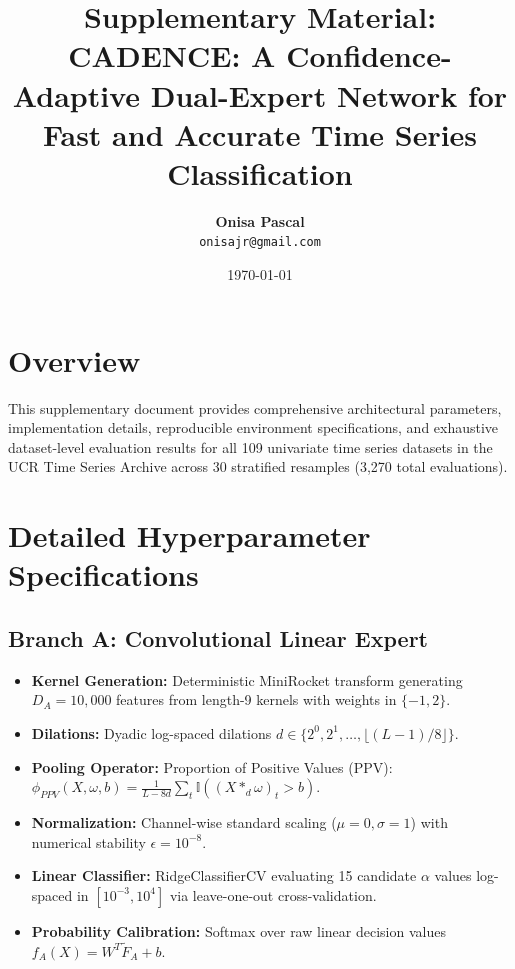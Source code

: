 \documentclass[journal,onecolumn]{article}
\title{\textbf{Supplementary Material:\\CADENCE: A Confidence-Adaptive Dual-Expert Network for Fast and Accurate Time Series Classification}}
\author{
    \textbf{Onisa Pascal}\\
    \texttt{onisajr@gmail.com}
}
\date{\today}
\begin{document}
\maketitle

\section{Overview}
This supplementary document provides comprehensive architectural parameters, implementation details, reproducible environment specifications, and exhaustive dataset-level evaluation results for all 109 univariate time series datasets in the UCR Time Series Archive across 30 stratified resamples (3,270 total evaluations).

\section{Detailed Hyperparameter Specifications}

\subsection{Branch A: Convolutional Linear Expert}
\begin{itemize}
    \item \textbf{Kernel Generation:} Deterministic MiniRocket transform generating $D_A = 10,000$ features from length-9 kernels with weights in $\{-1, 2\}$.
    \item \textbf{Dilations:} Dyadic log-spaced dilations $d \in \{2^0, 2^1, \dots, \lfloor (L-1)/8 \rfloor\}$.
    \item \textbf{Pooling Operator:} Proportion of Positive Values (PPV): $\phi_{PPV}(X, \omega, b) = \frac{1}{L - 8d} \sum_t \mathbb{I}((X *_{d} \omega)_t > b)$.
    \item \textbf{Normalization:} Channel-wise standard scaling ($\mu=0, \sigma=1$) with numerical stability $\epsilon = 10^{-8}$.
    \item \textbf{Linear Classifier:} RidgeClassifierCV evaluating 15 candidate $\alpha$ values log-spaced in $[10^{-3}, 10^{4}]$ via leave-one-out cross-validation.
    \item \textbf{Probability Calibration:} Softmax over raw linear decision values $f_{A}(X) = W^T \tilde{F}_A + b$.
\end{itemize}
\end{document}
